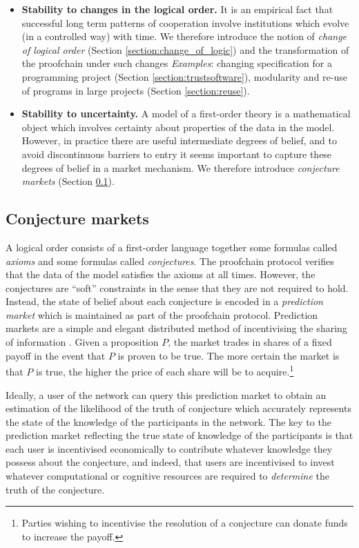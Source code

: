 \documentclass[english,letter paper,12pt,reqno]{article}
\theoremstyle{example}
\begin{document}
\begin{itemize}
\item \textbf{Stability to changes in the logical order.} It is an empirical fact that successful long term patterns of cooperation involve institutions which evolve (in a controlled way) with time. We therefore introduce the notion of \emph{change of logical order} (Section \ref{section:change_of_logic}) and the transformation of the proofchain under such changes \emph{Examples}: changing specification for a programming project (Section \ref{section:trustsoftware}), modularity and re-use of programs in large projects (Section \ref{section:reuse}).

\item \textbf{Stability to uncertainty.} A model of a first-order theory is a mathematical object which involves certainty about properties of the data in the model. However, in practice there are useful intermediate degrees of belief, and to avoid discontinuous barriers to entry it seems important to capture these degrees of belief in a market mechanism. We therefore introduce \emph{conjecture markets} (Section \ref{section:conjecture_markets}).
\end{itemize}

\subsection{Conjecture markets}\label{section:conjecture_markets}

A logical order consists of a first-order language together some formulas called \emph{axioms} and some formulas called \emph{conjectures}. The proofchain protocol verifies that the data of the model satisfies the axioms at all times. However, the conjectures are ``soft'' constraints in the sense that they are not required to hold. Instead, the state of belief about each conjecture is encoded in a \emph{prediction market} which is maintained as part of the proofchain protocol. Prediction markets are a simple and elegant distributed method of incentivising the sharing of information \cite{hanson3}. Given a proposition $P$, the market trades in shares of a fixed payoff in the event that $P$ is proven to be true. The more certain the market is that $P$ is true, the higher the price of each share will be to acquire.\footnote{Parties wishing to incentivise the resolution of a conjecture can donate funds to increase the payoff.}

Ideally, a user of the network can query this prediction market to obtain an estimation of the likelihood of the truth of conjecture which accurately represents the state of the knowledge of the participants in the network. The key to the prediction market reflecting the true state of knowledge of the participants is that each user is incentivised economically to contribute whatever knowledge they possess about the conjecture, and indeed, that users are incentivised to invest whatever computational or cognitive resources are required to \emph{determine} the truth of the conjecture.
\end{document}
